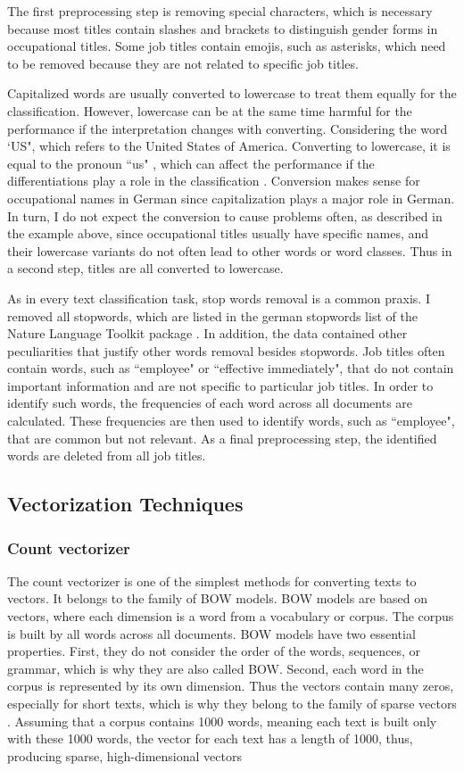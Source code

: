 \documentclass[12pt, a4paper, titlepage]{article}
\begin{document}
The first preprocessing step is removing special characters, which is necessary because most titles contain slashes and brackets to distinguish gender forms in occupational titles. Some job titles contain emojis, such as asterisks, which need to be removed because they are not related to specific job titles. 

Capitalized words are usually converted to lowercase to treat them equally for the classification. However, lowercase can be at the same time harmful for the performance if the interpretation changes with converting. Considering the word `US", which refers to the United States of America. Converting to lowercase, it is equal to the pronoun ``us" , which can affect the performance if the differentiations play a role in the classification \citep{kowsari2019text}. Conversion makes sense for occupational names in German since capitalization plays a major role in German. In turn, I do not expect the conversion to cause problems often, as described in the example above, since occupational titles usually have specific names, and their lowercase variants do not often lead to other words or word classes. Thus in a second step, titles are all converted to lowercase. 

As in every text classification task, stop words removal is a common praxis. I removed all stopwords, which are listed in the german stopwords list of the Nature Language Toolkit package \citep{bird2009}. In addition, the data contained other peculiarities that justify other words removal besides stopwords. Job titles often contain words, such as ``employee" or ``effective immediately", that do not contain important information and are not specific to particular job titles. In order to identify such words, the frequencies of each word across all documents are calculated. These frequencies are then used to identify words, such as ``employee", that are common but not relevant. As a final preprocessing step, the identified words are deleted from all job titles.  

\subsection{Vectorization Techniques}
\subsubsection*{Count vectorizer}
The count vectorizer is one of the simplest methods for converting texts to vectors. It belongs to the family of \ac{BOW} models. \ac{BOW} models are based on vectors, where each dimension is a word from a vocabulary or corpus. The corpus is built by all words across all documents. \ac{BOW} models have two essential properties. First, they do not consider the order of the words, sequences, or grammar, which is why they are also called \ac{BOW}. Second, each word in the corpus is represented by its own dimension. Thus the vectors contain many zeros, especially for short texts, which is why they belong to the family of sparse vectors \citep{ajose2020}. Assuming that a corpus contains 1000 words, meaning each text is built only with these 1000 words, the vector for each text has a length of 1000, thus, producing sparse, high-dimensional vectors \citep{kulkarni2021, sarkar2016}
\end{document}
